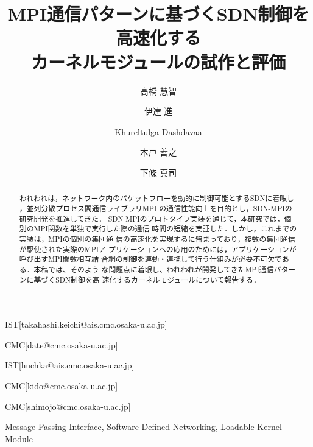 \documentclass[submit,techrep,noauthor]{ipsj}
\begin{document}
\title{MPI通信パターンに基づくSDN制御を高速化する\\
    カーネルモジュールの試作と評価}



\author{高橋 慧智}{}{IST}[takahashi.keichi@ais.cmc.osaka-u.ac.jp]
\author{伊達 進}{}{CMC}[date@cmc.osaka-u.ac.jp]
\author{Khureltulga Dashdavaa}{}{IST}[huchka@ais.cmc.osaka-u.ac.jp]
\author{木戸 善之}{}{CMC}[kido@cmc.osaka-u.ac.jp]
\author{下條 真司}{}{CMC}[shimojo@cmc.osaka-u.ac.jp]

\begin{abstract}
われわれは，ネットワーク内のパケットフローを動的に制御可能とするSDNに着眼し
，並列分散プロセス間通信ライブラリMPI の通信性能向上を目的とし，SDN-MPIの
研究開発を推進してきた．
SDN-MPIのプロトタイプ実装を通じて，本研究では，個別のMPI関数を単独で実行した際の通信
時間の短縮を実証した．しかし，これまでの実装は，MPIの個別の集団通
信の高速化を実現するに留まっており，複数の集団通信が駆使された実際のMPIア
プリケーションへの応用のためには，アプリケーションが呼び出すMPI関数相互結
合網の制御を連動・連携して行う仕組みが必要不可欠である．本稿では、そのよう
な問題点に着眼し、われわれが開発してきたMPI通信パターンに基づくSDN制御を高
速化するカーネルモジュールについて報告する．
\end{abstract}

\begin{jkeyword}
Message Passing Interface, Software-Defined Networking, Loadable Kernel Module
\end{jkeyword}

\maketitle








\end{document}
